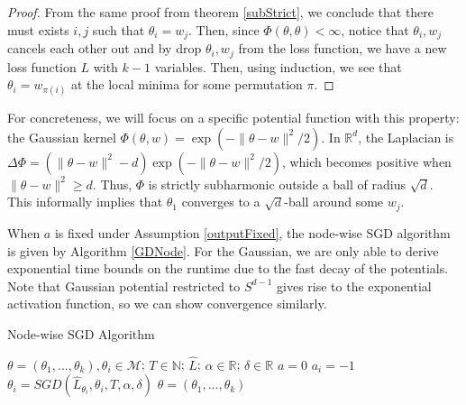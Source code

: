 \documentclass{article}
\newcommand{\N}{{\mathbb{N}}}
\newcommand{\R}{{\mathbb{R}}}
\begin{document}
\begin{proof}
From the same proof from theorem \ref{subStrict}, we conclude that there must exists $i, j$ such that $\theta_i = w_j$. Then, since $\Phi(\theta,\theta) < \infty$, notice that $\theta_i, w_j$ cancels each other out and by drop $\theta_i, w_j$ from the loss function, we have a new loss function $L$ with $k-1$ variables. Then, using induction, we see that $\theta_i = w_{\pi(i)}$ at the local minima for some permutation $\pi$.
\end{proof}

For concreteness, we will focus on a specific potential function with this property: the Gaussian kernel $\Phi(\theta, w) = \exp(-\|\theta - w\|^2/2)$. In $\R^d$, the Laplacian is $\Delta \Phi = ( \|\theta - w\|^2 -d ) \exp(-\|\theta - w\|^2/2)$, which becomes positive when $\|\theta - w \|^2 \geq d$. Thus, $\Phi$ is strictly subharmonic outside a ball of radius $\sqrt{d}$. This informally implies that $\theta_1$ converges to a $\sqrt{d}$-ball around some $w_j$. 

When $a$ is fixed under Assumption \ref{outputFixed}, the node-wise
SGD algorithm is given by Algorithm \ref{GDNode}. For the Gaussian, we
are only able to derive exponential time bounds on the runtime due to
the fast decay of the potentials. Note that Gaussian potential
restricted to $S^{d-1}$ gives rise to the exponential activation
function, so we can show convergence similarly.

\begin{algorithm}[hb]
 \caption{Node-wise SGD Algorithm}
   \label{GDNode}
\begin{algorithmic}
    $\theta = (\theta_1,...,\theta_k), \theta_i \in \mathcal{M}$; $T\in \N$; $\widehat{L}$; $\alpha\in \R$; $\delta \in \R$
   \vspace{0.1in}
    $a = 0$
   \STATE $a_i = -1$
   \STATE  $\theta_i =  SGD( \widehat{L}_{\theta_i},\theta_i,T, \alpha,\delta)$
   \ENDFOR
    $\theta = (\theta_1,...,\theta_k)$
\end{algorithmic}
\end{algorithm}
\end{document}
